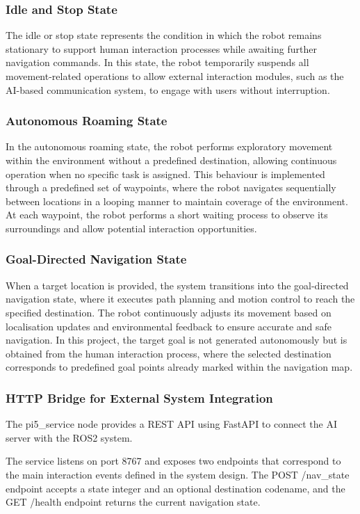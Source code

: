 \subsubsection{Idle and Stop State}
The idle or stop state represents the condition in which the robot remains stationary to support human interaction processes while awaiting further navigation commands. In this state, the robot temporarily suspends all movement-related operations to allow external interaction modules, such as the AI-based communication system, to engage with users without interruption.

\subsubsection{Autonomous Roaming State}
In the autonomous roaming state, the robot performs exploratory movement within the environment without a predefined destination, allowing continuous operation when no specific task is assigned. This behaviour is implemented through a predefined set of waypoints, where the robot navigates sequentially between locations in a looping manner to maintain coverage of the environment. At each waypoint, the robot performs a short waiting process to observe its surroundings and allow potential interaction opportunities.

\subsubsection{Goal-Directed Navigation State}
When a target location is provided, the system transitions into the goal-directed navigation state, where it executes path planning and motion control to reach the specified destination. The robot continuously adjusts its movement based on localisation updates and environmental feedback to ensure accurate and safe navigation. In this project, the target goal is not generated autonomously but is obtained from the human interaction process, where the selected destination corresponds to predefined goal points already marked within the navigation map.

\subsubsection{HTTP Bridge for External System Integration}
The pi5\_service node provides a REST API using FastAPI to connect the AI server with the ROS2 system.

The service listens on port 8767 and exposes two endpoints that correspond to the main interaction events defined in the system design. The POST /nav\_state endpoint accepts a state integer and an optional destination codename, and the GET /health endpoint returns the current navigation state.

